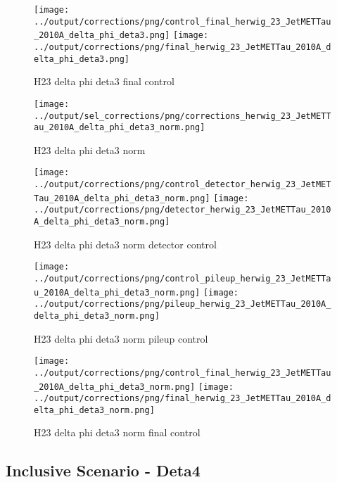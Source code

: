 \documentclass[11pt]{book}
\begin{document}
\begin{figure}[ht]
\centering
\texttt{[image: ../output/corrections/png/control\_final\_herwig\_23\_JetMETTau\_2010A\_delta\_phi\_deta3.png]}
\texttt{[image: ../output/corrections/png/final\_herwig\_23\_JetMETTau\_2010A\_delta\_phi\_deta3.png]}
\caption{H23 delta phi deta3 final control}
\label{fig:H23_JetMETTau_2010A_delta_phi_deta3_final_control}
\end{figure}


\begin{figure}[ht]
\centering
\texttt{[image: ../output/sel\_corrections/png/corrections\_herwig\_23\_JetMETTau\_2010A\_delta\_phi\_deta3\_norm.png]}
\caption{H23 delta phi deta3 norm}
\label{fig:H23_JetMETTau_2010A_delta_phi_deta3_norm}
\end{figure}

\begin{figure}[ht]
\centering
\texttt{[image: ../output/corrections/png/control\_detector\_herwig\_23\_JetMETTau\_2010A\_delta\_phi\_deta3\_norm.png]}
\texttt{[image: ../output/corrections/png/detector\_herwig\_23\_JetMETTau\_2010A\_delta\_phi\_deta3\_norm.png]}
\caption{H23 delta phi deta3 norm detector control}
\label{fig:H23_JetMETTau_2010A_delta_phi_deta3_norm_detector_control}
\end{figure}

\begin{figure}[ht]
\centering
\texttt{[image: ../output/corrections/png/control\_pileup\_herwig\_23\_JetMETTau\_2010A\_delta\_phi\_deta3\_norm.png]}
\texttt{[image: ../output/corrections/png/pileup\_herwig\_23\_JetMETTau\_2010A\_delta\_phi\_deta3\_norm.png]}
\caption{H23 delta phi deta3 norm pileup control}
\label{fig:H23_JetMETTau_2010A_delta_phi_deta3_norm_pileup_control}
\end{figure}


\begin{figure}[ht]
\centering
\texttt{[image: ../output/corrections/png/control\_final\_herwig\_23\_JetMETTau\_2010A\_delta\_phi\_deta3\_norm.png]}
\texttt{[image: ../output/corrections/png/final\_herwig\_23\_JetMETTau\_2010A\_delta\_phi\_deta3\_norm.png]}
\caption{H23 delta phi deta3 norm final control}
\label{fig:H23_JetMETTau_2010A_delta_phi_deta3_norm_final_control}
\end{figure}


\clearpage
\subsection{Inclusive Scenario - Deta4}
\end{document}
